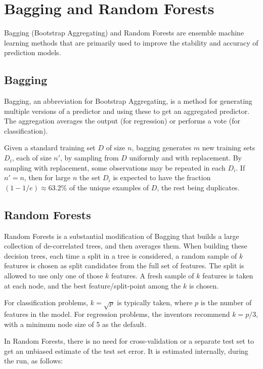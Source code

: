\chapter{Bagging and Random Forests}

Bagging (Bootstrap Aggregating) and Random Forests are ensemble machine learning methods that are primarily used to improve the stability and accuracy of prediction models.

\section{Bagging}

Bagging, an abbreviation for Bootstrap Aggregating, is a method for generating multiple versions of a predictor and using these to get an aggregated predictor. The aggregation averages the output (for regression) or performs a vote (for classification). 

Given a standard training set $D$ of size $n$, bagging generates $m$ new training sets $D_i$, each of size $n'$, by sampling from $D$ uniformly and with replacement. By sampling with replacement, some observations may be repeated in each $D_i$. If $n'=n$, then for large $n$ the set $D_i$ is expected to have the fraction $(1 - 1/e) \approx 63.2\%$ of the unique examples of $D$, the rest being duplicates. 

\section{Random Forests}

Random Forests is a substantial modification of Bagging that builds a large collection of de-correlated trees, and then averages them. When building these decision trees, each time a split in a tree is considered, a random sample of $k$ features is chosen as split candidates from the full set of features. The split is allowed to use only one of those $k$ features. A fresh sample of $k$ features is taken at each node, and the best feature/split-point among the $k$ is chosen. 

For classification problems, $k = \sqrt{p}$ is typically taken, where $p$ is the number of features in the model. For regression problems, the inventors recommend $k = p/3$, with a minimum node size of 5 as the default. 

In Random Forests, there is no need for cross-validation or a separate test set to get an unbiased estimate of the test set error. It is estimated internally, during the run, as follows:

